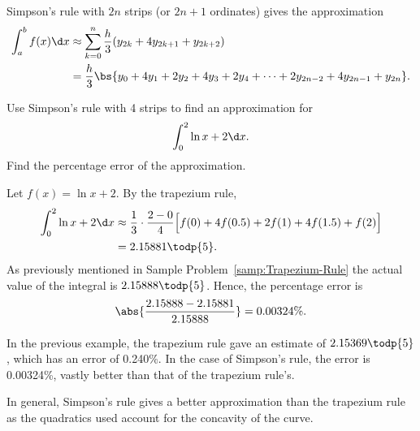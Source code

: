 \begin{recipe}
    Simpson's rule with $2n$ strips (or $2n+1$ ordinates) gives the approximation
    \begin{align*}
        \int_a^b f(x) \d x &\approx \sum_{k = 0}^n \frac{h}{3} (y_{2k} + 4y_{2k+1} + y_{2k+2})\\
        &= \frac{h}{3} \bs{y_0 + 4y_1 + 2y_2 + 4y_3 + 2y_4 + \dots + 2y_{2n-2} + 4y_{2n-1} + y_{2n}}.
    \end{align*}
\end{recipe}

\begin{sample}
    Use Simpson's rule with 4 strips to find an approximation for \[\int_0^2 \ln{x + 2} \d x.\] Find the percentage error of the approximation.
\end{sample}
\begin{sampans}
    Let $f(x) = \ln{x+2}$. By the trapezium rule,
    \begin{align*}
        \int_0^2 \ln{x + 2} \d x &\approx \frac{1}{3} \cdot \frac{2 - 0}{4} \Big[f(0) + 4f(0.5) + 2f(1) + 4f(1.5) + f(2)\Big] \\
        &= 2.15881 \todp{5}.
    \end{align*}
    As previously mentioned in Sample Problem~\ref{samp:Trapezium-Rule} the actual value of the integral is $2.15888 \todp{5}$. Hence, the percentage error is \[\abs{\frac{2.15888 - 2.15881}{2.15888}} = 0.00324\%.\]
\end{sampans}

In the previous example, the trapezium rule gave an estimate of $2.15369 \todp{5}$, which has an error of 0.240\%. In the case of Simpson's rule, the error is 0.00324\%, vastly better than that of the trapezium rule's.

In general, Simpson's rule gives a better approximation than the trapezium rule as the quadratics used account for the concavity of the curve.